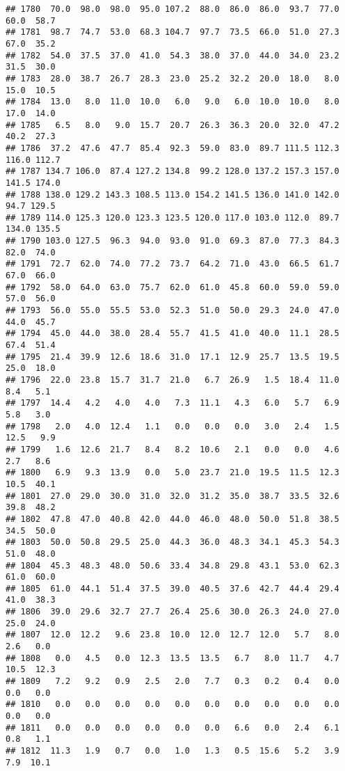 \documentclass[
]{article}
\begin{document}
\begin{verbatim}
## 1780  70.0  98.0  98.0  95.0 107.2  88.0  86.0  86.0  93.7  77.0  60.0  58.7
## 1781  98.7  74.7  53.0  68.3 104.7  97.7  73.5  66.0  51.0  27.3  67.0  35.2
## 1782  54.0  37.5  37.0  41.0  54.3  38.0  37.0  44.0  34.0  23.2  31.5  30.0
## 1783  28.0  38.7  26.7  28.3  23.0  25.2  32.2  20.0  18.0   8.0  15.0  10.5
## 1784  13.0   8.0  11.0  10.0   6.0   9.0   6.0  10.0  10.0   8.0  17.0  14.0
## 1785   6.5   8.0   9.0  15.7  20.7  26.3  36.3  20.0  32.0  47.2  40.2  27.3
## 1786  37.2  47.6  47.7  85.4  92.3  59.0  83.0  89.7 111.5 112.3 116.0 112.7
## 1787 134.7 106.0  87.4 127.2 134.8  99.2 128.0 137.2 157.3 157.0 141.5 174.0
## 1788 138.0 129.2 143.3 108.5 113.0 154.2 141.5 136.0 141.0 142.0  94.7 129.5
## 1789 114.0 125.3 120.0 123.3 123.5 120.0 117.0 103.0 112.0  89.7 134.0 135.5
## 1790 103.0 127.5  96.3  94.0  93.0  91.0  69.3  87.0  77.3  84.3  82.0  74.0
## 1791  72.7  62.0  74.0  77.2  73.7  64.2  71.0  43.0  66.5  61.7  67.0  66.0
## 1792  58.0  64.0  63.0  75.7  62.0  61.0  45.8  60.0  59.0  59.0  57.0  56.0
## 1793  56.0  55.0  55.5  53.0  52.3  51.0  50.0  29.3  24.0  47.0  44.0  45.7
## 1794  45.0  44.0  38.0  28.4  55.7  41.5  41.0  40.0  11.1  28.5  67.4  51.4
## 1795  21.4  39.9  12.6  18.6  31.0  17.1  12.9  25.7  13.5  19.5  25.0  18.0
## 1796  22.0  23.8  15.7  31.7  21.0   6.7  26.9   1.5  18.4  11.0   8.4   5.1
## 1797  14.4   4.2   4.0   4.0   7.3  11.1   4.3   6.0   5.7   6.9   5.8   3.0
## 1798   2.0   4.0  12.4   1.1   0.0   0.0   0.0   3.0   2.4   1.5  12.5   9.9
## 1799   1.6  12.6  21.7   8.4   8.2  10.6   2.1   0.0   0.0   4.6   2.7   8.6
## 1800   6.9   9.3  13.9   0.0   5.0  23.7  21.0  19.5  11.5  12.3  10.5  40.1
## 1801  27.0  29.0  30.0  31.0  32.0  31.2  35.0  38.7  33.5  32.6  39.8  48.2
## 1802  47.8  47.0  40.8  42.0  44.0  46.0  48.0  50.0  51.8  38.5  34.5  50.0
## 1803  50.0  50.8  29.5  25.0  44.3  36.0  48.3  34.1  45.3  54.3  51.0  48.0
## 1804  45.3  48.3  48.0  50.6  33.4  34.8  29.8  43.1  53.0  62.3  61.0  60.0
## 1805  61.0  44.1  51.4  37.5  39.0  40.5  37.6  42.7  44.4  29.4  41.0  38.3
## 1806  39.0  29.6  32.7  27.7  26.4  25.6  30.0  26.3  24.0  27.0  25.0  24.0
## 1807  12.0  12.2   9.6  23.8  10.0  12.0  12.7  12.0   5.7   8.0   2.6   0.0
## 1808   0.0   4.5   0.0  12.3  13.5  13.5   6.7   8.0  11.7   4.7  10.5  12.3
## 1809   7.2   9.2   0.9   2.5   2.0   7.7   0.3   0.2   0.4   0.0   0.0   0.0
## 1810   0.0   0.0   0.0   0.0   0.0   0.0   0.0   0.0   0.0   0.0   0.0   0.0
## 1811   0.0   0.0   0.0   0.0   0.0   0.0   6.6   0.0   2.4   6.1   0.8   1.1
## 1812  11.3   1.9   0.7   0.0   1.0   1.3   0.5  15.6   5.2   3.9   7.9  10.1

\end{verbatim}
\end{document}
